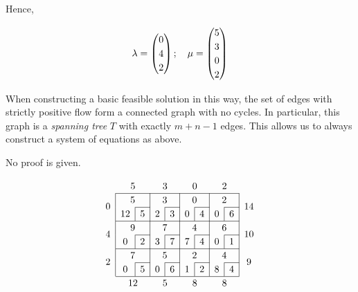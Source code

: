 \noindent Hence,

\[
	\vb\lambda = \begin{pmatrix}
		0 \\ 4 \\ 2
	\end{pmatrix};\quad \vb\mu = \begin{pmatrix}
		5 \\3\\0\\2
	\end{pmatrix}
\]

\begin{theorem}
	When constructing a basic feasible solution in this way, the set of edges with strictly positive flow form a connected graph with no cycles.
	In particular, this graph is a \textit{spanning tree} \( T \) with exactly \( m + n - 1 \) edges.
	This allows us to always construct a system of equations as above.
\end{theorem}
\noindent No proof is given.

\[
	\arraycolsep=5pt\def\arraystretch{1.2}
	\begin{array}{c|c|c|c|c|c|c|c|c|c}
		\multicolumn{1}{c}{}   & \multicolumn{2}{c}{5}   & \multicolumn{2}{c}{3}  & \multicolumn{2}{c}{0}  & \multicolumn{2}{c}{2}  & \multicolumn{1}{c}{}                                       \\\cline{2-9}
		\multirow{2}{*}{\(0\)} & \multicolumn{2}{c|}{5}  & \multicolumn{2}{c|}{3} & \multicolumn{2}{c|}{0} & \multicolumn{2}{c|}{2} & \multirow{2}{*}{\(14\)}                                    \\\cline{3-3}\cline{5-5}\cline{7-7}\cline{9-9}
		                       & \multicolumn{1}{c|}{12} & 5                      & \multicolumn{1}{c|}{2} & 3                      & \multicolumn{1}{c|}{0}  & 4 & \multicolumn{1}{c|}{0} & 6 & \\\cline{2-9}
		\multirow{2}{*}{\(4\)} & \multicolumn{2}{c|}{9}  & \multicolumn{2}{c|}{7} & \multicolumn{2}{c|}{4} & \multicolumn{2}{c|}{6} & \multirow{2}{*}{\(10\)}                                    \\\cline{3-3}\cline{5-5}\cline{7-7}\cline{9-9}
		                       & \multicolumn{1}{c|}{0}  & 2                      & \multicolumn{1}{c|}{3} & 7                      & \multicolumn{1}{c|}{7}  & 4 & \multicolumn{1}{c|}{0} & 1 & \\\cline{2-9}
		\multirow{2}{*}{\(2\)} & \multicolumn{2}{c|}{7}  & \multicolumn{2}{c|}{5} & \multicolumn{2}{c|}{2} & \multicolumn{2}{c|}{4} & \multirow{2}{*}{\(9\)}                                     \\\cline{3-3}\cline{5-5}\cline{7-7}\cline{9-9}
		                       & \multicolumn{1}{c|}{0}  & 5                      & \multicolumn{1}{c|}{0} & 6                      & \multicolumn{1}{c|}{1}  & 2 & \multicolumn{1}{c|}{8} & 4 & \\\cline{2-9}
		\multicolumn{1}{c}{}   & \multicolumn{2}{c}{12}  & \multicolumn{2}{c}{5}  & \multicolumn{2}{c}{8}  & \multicolumn{2}{c}{8}  & \multicolumn{1}{c}{}
	\end{array}
\]

